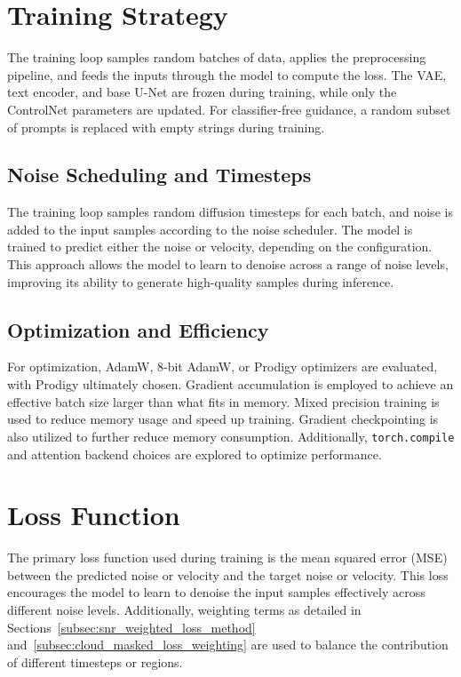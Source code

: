 \section{Training Strategy}
\label{sec:training_strategy}

The training loop samples random batches of data, applies the preprocessing pipeline, and feeds the inputs through the model to compute the loss. The VAE, text encoder, and base U-Net are frozen during training, while only the ControlNet parameters are updated. For classifier-free guidance, a random subset of prompts is replaced with empty strings during training.

\subsection{Noise Scheduling and Timesteps}
\label{subsec:noise_scheduling_and_timesteps}

The training loop samples random diffusion timesteps for each batch, and noise is added to the input samples according to the noise scheduler. The model is trained to predict either the noise or velocity, depending on the configuration. This approach allows the model to learn to denoise across a range of noise levels, improving its ability to generate high-quality samples during inference.

\subsection{Optimization and Efficiency}
\label{subsec:optimization_and_efficiency}

For optimization, AdamW, 8-bit AdamW, or Prodigy optimizers are evaluated, with Prodigy ultimately chosen. Gradient accumulation is employed to achieve an effective batch size larger than what fits in memory. Mixed precision training is used to reduce memory usage and speed up training. Gradient checkpointing is also utilized to further reduce memory consumption. Additionally, \texttt{torch.compile} and attention backend choices are explored to optimize performance.

\section{Loss Function}
\label{sec:loss_function}

The primary loss function used during training is the mean squared error (MSE) between the predicted noise or velocity and the target noise or velocity. This loss encourages the model to learn to denoise the input samples effectively across different noise levels. Additionally, weighting terms as detailed in Sections~\ref{subsec:snr_weighted_loss_method} and~\ref{subsec:cloud_masked_loss_weighting} are used to balance the contribution of different timesteps or regions.

